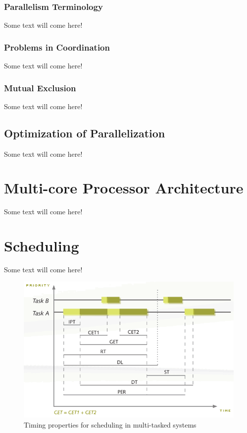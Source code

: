 \subsubsection{Parallelism Terminology}  %
Some text will come here! \\
\subsubsection{Problems in Coordination} %
Some text will come here! \\
\subsubsection{Mutual Exclusion} %
Some text will come here! \\
\subsection{Optimization of Parallelization}
Some text will come here! \\
\section{Multi-core Processor Architecture}
Some text will come here! \\
\section{Scheduling} %
Some text will come here! \\
\begin{figure}[!ht]
	\includegraphics[scale=0.6]{content/images/scheduling.png}
	\caption{Timing properties for scheduling in multi-tasked systems \cite{timingposter}}
	\label{fig:scheduling}
\end{figure}
